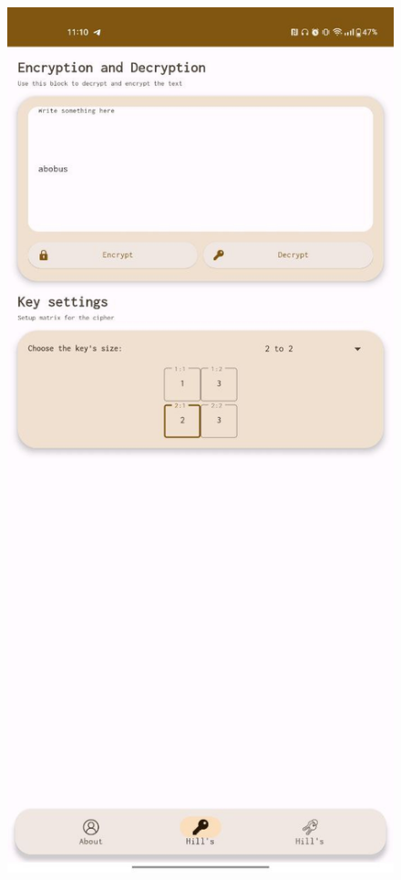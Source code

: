 \documentclass[a4paper]{article}
\begin{document}
\begin{figure}[H]
\begin{minipage}{0.3\textwidth}
        \includegraphics[width=\textwidth]{02_0001}

\end{minipage}
\end{figure}
\end{document}
